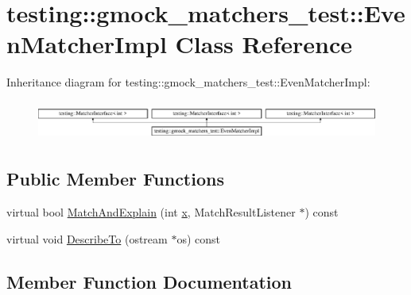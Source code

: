 \hypertarget{classtesting_1_1gmock__matchers__test_1_1_even_matcher_impl}{}\section{testing\+::gmock\+\_\+matchers\+\_\+test\+::Even\+Matcher\+Impl Class Reference}
\label{classtesting_1_1gmock__matchers__test_1_1_even_matcher_impl}
Inheritance diagram for testing\+::gmock\+\_\+matchers\+\_\+test\+::Even\+Matcher\+Impl\+:\begin{figure}[H]
\begin{center}
\leavevmode
\includegraphics[height=1.305361cm]{d3/dea/classtesting_1_1gmock__matchers__test_1_1_even_matcher_impl}
\end{center}
\end{figure}
\subsection*{Public Member Functions}
\begin{DoxyCompactItemize}
\item 
virtual bool \mbox{\hyperlink{classtesting_1_1gmock__matchers__test_1_1_even_matcher_impl_a0ca990403daf3856cda897e4b1a02ae4}{Match\+And\+Explain}} (int \mbox{\hyperlink{_obj__test_2lib_2googletest-master_2googlemock_2test_2gmock-matchers__test_8cc_a6150e0515f7202e2fb518f7206ed97dc}{x}}, Match\+Result\+Listener $\ast$) const
\item 
virtual void \mbox{\hyperlink{classtesting_1_1gmock__matchers__test_1_1_even_matcher_impl_ae72d37964b4004dfa3a04d7b529ad2f9}{Describe\+To}} (ostream $\ast$os) const
\end{DoxyCompactItemize}


\subsection{Member Function Documentation}
\mbox{\label{classtesting_1_1gmock__matchers__test_1_1_even_matcher_impl_ae72d37964b4004dfa3a04d7b529ad2f9}} 
